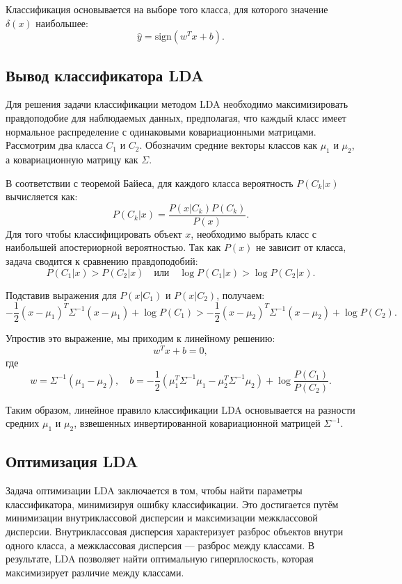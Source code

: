 Классификация основывается на выборе того класса, для которого значение \( \delta(x) \) наибольшее:
\[
\hat{y} = \text{sign}(w^T x + b).
\]

\subsection*{Вывод классификатора LDA}

Для решения задачи классификации методом LDA необходимо максимизировать правдоподобие для наблюдаемых данных, предполагая, что каждый класс имеет нормальное распределение с одинаковыми ковариационными матрицами. Рассмотрим два класса \( C_1 \) и \( C_2 \). Обозначим средние векторы классов как \( \mu_1 \) и \( \mu_2 \), а ковариационную матрицу как \( \Sigma \).

В соответствии с теоремой Байеса, для каждого класса вероятность \( P(C_k | x) \) вычисляется как:
\[
P(C_k | x) = \frac{P(x | C_k) P(C_k)}{P(x)}.
\]
Для того чтобы классифицировать объект \( x \), необходимо выбрать класс с наибольшей апостериорной вероятностью. Так как \( P(x) \) не зависит от класса, задача сводится к сравнению правдоподобий:
\[
P(C_1 | x) > P(C_2 | x) \quad \text{или} \quad \log P(C_1 | x) > \log P(C_2 | x).
\]

Подставив выражения для \( P(x | C_1) \) и \( P(x | C_2) \), получаем:
\[
- \frac{1}{2} (x - \mu_1)^T \Sigma^{-1} (x - \mu_1) + \log P(C_1) > - \frac{1}{2} (x - \mu_2)^T \Sigma^{-1} (x - \mu_2) + \log P(C_2).
\]

Упростив это выражение, мы приходим к линейному решению:
\[
w^T x + b = 0,
\]
где
\[
w = \Sigma^{-1} (\mu_1 - \mu_2), \quad b = -\frac{1}{2} (\mu_1^T \Sigma^{-1} \mu_1 - \mu_2^T \Sigma^{-1} \mu_2) + \log \frac{P(C_1)}{P(C_2)}.
\]

Таким образом, линейное правило классификации LDA основывается на разности средних \( \mu_1 \) и \( \mu_2 \), взвешенных инвертированной ковариационной матрицей \( \Sigma^{-1} \).

\subsection*{Оптимизация LDA}

Задача оптимизации LDA заключается в том, чтобы найти параметры классификатора, минимизируя ошибку классификации. Это достигается путём минимизации внутриклассовой дисперсии и максимизации межклассовой дисперсии. Внутриклассовая дисперсия характеризует разброс объектов внутри одного класса, а межклассовая дисперсия — разброс между классами. В результате, LDA позволяет найти оптимальную гиперплоскость, которая максимизирует различие между классами.

